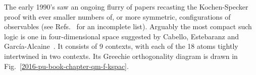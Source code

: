 The early 1990's saw an ongoing flurry of papers recasting the Kochen-Specker proof with ever smaller numbers of,
or more symmetric, configurations of
observables
(see Refs.~\cite{peres-91,penrose-ks,Peres:1996fk,Kernaghan-1994,mermin-93,bub,svozil-tkadlec,tkadlec-96,cabello-96,Cabello-1996ega,CalHerSvo-tatra,tkadlec-00,tkadlec-01,pavicic:inria-00070615,Smith-2004,Pavicic-2005,Arends2011,Waegell-2011,1751-8121-44-50-505303,Planat2012,PhysRevLett.108.030402,Cabello-2014-PhysRevA.89.042101} for an incomplete list).
Arguably the most compact such logic is one in four-dimensional space suggested by Cabello, Estebaranz and Garc{\'{i}}a-Alcaine~\cite{cabello-96,cabello-99,Pavicic-2005}.
It consists of 9 contexts, with each of the 18 atoms tightly intertwined in two contexts.
Its Greechie orthogonality diagram is drawn in Fig.~\ref{2016-pu-book-chapter-qm-f-kspac}.
